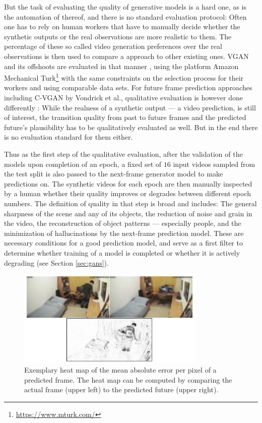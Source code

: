 But the task of evaluating the quality of generative models is a hard one, as is the automation of thereof, and there is no standard evaluation protocol: Often one has to rely on human workers that have to manually decide whether the synthetic outputs or the real observations are more realistic to them. The percentage of these so called video generation preferences over the real observations is then used to compare a approach to other existing ones. VGAN and its offshoots are evaluated in that manner \cite{vondrick2016generating, tulyakov2018mocogan, spampinato2018vos, spampinato2019adversarial}, using the platform Amazon Mechanical Turk\footnote{\url{https://www.mturk.com/}} with the same constraints on the selection process for their workers and using comparable data sets. For future frame prediction approaches including C-VGAN by Vondrick et al., qualitative evaluation is however done differently \cite{vondrick2016generating, vondrick2017generating, jang2018video, talafha2020attentional}: While the realness of a synthetic output --- a video prediction, is still of interest, the transition quality from past to future frames and the predicted future's plausibility has to be qualitatively evaluated as well. But in the end there is no evaluation standard for them either.

Thus as the first step of the qualitative evaluation, after the validation of the models upon completion of an epoch, a fixed set of $16$ input videos sampled from the test split is also passed to the next-frame generator model to make predictions on. The synthetic videos for each epoch are then manually inspected by a human whether their quality improves or degrades between different epoch numbers. The definition of quality in that step is broad and includes: The general sharpness of the scene and any of its objects, the reduction of noise and grain in the video, the reconstruction of object patterns --- especially people, and the minimization of hallucinations by the next-frame prediction model. These are necessary conditions for a good prediction model, and serve as a first filter to determine whether training of a model is completed or whether it is actively degrading (see Section \ref{sec:gans}).

\begin{figure}
	\centering
	\includegraphics[width=0.8\textwidth]{graphics/eval/heatmap/heatmap.pdf}
  \caption[Exemplary heat map of the mean absolute error per pixel of a predicted frame.]{Exemplary heat map of the mean absolute error per pixel of a predicted frame. The heat map can be computed by comparing the actual frame (upper left) to the predicted future (upper right).}
  \label{fig:prediction_comparison}
\end{figure}

